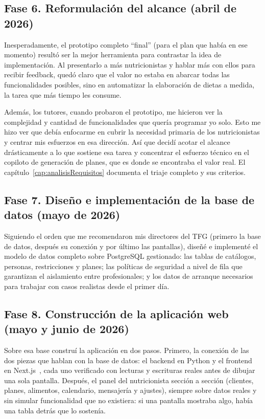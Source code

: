 \subsection*{Fase 6. Reformulación del alcance (abril de 2026)}
Inesperadamente, el prototipo completo ``final'' (para el plan que había en ese momento) resultó ser la mejor herramienta para contrastar la idea de implementación. Al presentarlo a más nutricionistas y hablar más con ellos para recibir feedback, quedó claro que el valor no estaba en abarcar todas las funcionalidades posibles, sino en automatizar la elaboración de dietas a medida, la tarea que más tiempo les consume.

Además, los tutores, cuando probaron el prototipo, me hicieron ver la complejidad y cantidad de funcionalidades que quería programar yo solo. Esto me hizo ver que debía enfocarme en cubrir la necesidad primaria de los nutricionistas y centrar mis esfuerzos en esa dirección. Así que decidí acotar el alcance drásticamente a lo que sostiene esa tarea y concentrar el esfuerzo técnico en el copiloto de generación de planes, que es donde se encontraba el valor real. El capítulo~\ref{cap:analisisRequisitos} documenta el triaje completo y sus criterios.

\subsection*{Fase 7. Diseño e implementación de la base de datos (mayo de 2026)}

Siguiendo el orden que me recomendaron mis directores del TFG (primero la base de datos, después su conexión y por último las pantallas), diseñé e implementé el modelo de datos completo sobre PostgreSQL gestionado: las tablas de catálogos, personas, restricciones y planes; las políticas de seguridad a nivel de fila que garantizan el aislamiento entre profesionales; y los datos de arranque necesarios para trabajar con casos realistas desde el primer día.

\subsection*{Fase 8. Construcción de la aplicación web (mayo y junio de 2026)}

Sobre esa base construí la aplicación en dos pasos. Primero, la conexión de las dos piezas que hablan con la base de datos: el backend en Python y el frontend en Next.js~\citep{nextjs}, cada uno verificado con lecturas y escrituras reales antes de dibujar una sola pantalla. Después, el panel del nutricionista sección a sección (clientes, planes, alimentos, calendario, mensajería y ajustes), siempre sobre datos reales y sin simular funcionalidad que no existiera: si una pantalla mostraba algo, había una tabla detrás que lo sostenía.


